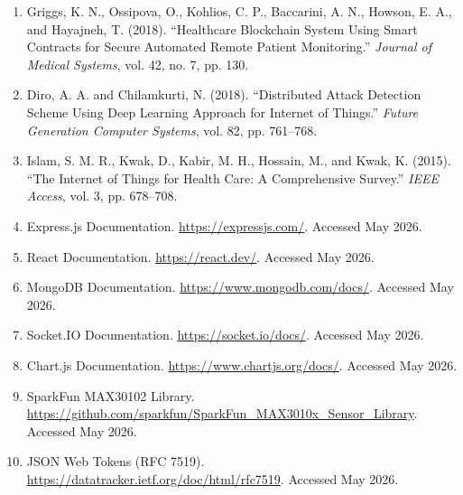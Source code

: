 \documentclass[12pt,a4paper]{report}
\begin{document}
\begin{enumerate}[leftmargin=*]
\item Griggs, K. N., Ossipova, O., Kohlios, C. P., Baccarini, A. N., Howson, E. A., and Hayajneh, T. (2018). ``Healthcare Blockchain System Using Smart Contracts for Secure Automated Remote Patient Monitoring.'' \textit{Journal of Medical Systems}, vol. 42, no. 7, pp. 130.

\item Diro, A. A. and Chilamkurti, N. (2018). ``Distributed Attack Detection Scheme Using Deep Learning Approach for Internet of Things.'' \textit{Future Generation Computer Systems}, vol. 82, pp. 761--768.

\item Islam, S. M. R., Kwak, D., Kabir, M. H., Hossain, M., and Kwak, K. (2015). ``The Internet of Things for Health Care: A Comprehensive Survey.'' \textit{IEEE Access}, vol. 3, pp. 678--708.

\item Express.js Documentation. \url{https://expressjs.com/}. Accessed May 2026.

\item React Documentation. \url{https://react.dev/}. Accessed May 2026.

\item MongoDB Documentation. \url{https://www.mongodb.com/docs/}. Accessed May 2026.

\item Socket.IO Documentation. \url{https://socket.io/docs/}. Accessed May 2026.

\item Chart.js Documentation. \url{https://www.chartjs.org/docs/}. Accessed May 2026.

\item SparkFun MAX30102 Library. \url{https://github.com/sparkfun/SparkFun_MAX3010x_Sensor_Library}. Accessed May 2026.

\item JSON Web Tokens (RFC 7519). \url{https://datatracker.ietf.org/doc/html/rfc7519}. Accessed May 2026.

\end{enumerate}
\end{document}
